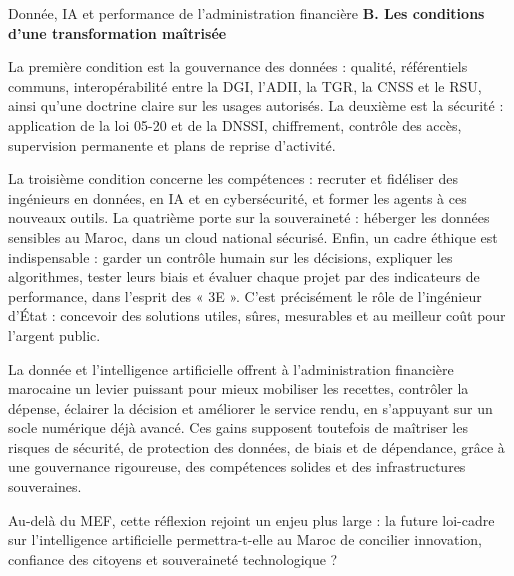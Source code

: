 \begin{copiemodele}{Donnée, IA et performance de l'administration financière}
\textbf{B. Les conditions d'une transformation maîtrisée}

La première condition est la gouvernance des données : qualité, référentiels communs, interopérabilité entre la DGI, l'ADII, la TGR, la CNSS et le RSU, ainsi qu'une doctrine claire sur les usages autorisés. La deuxième est la sécurité : application de la loi 05-20 et de la DNSSI, chiffrement, contrôle des accès, supervision permanente et plans de reprise d'activité.

La troisième condition concerne les compétences : recruter et fidéliser des ingénieurs en données, en IA et en cybersécurité, et former les agents à ces nouveaux outils. La quatrième porte sur la souveraineté : héberger les données sensibles au Maroc, dans un cloud national sécurisé. Enfin, un cadre éthique est indispensable : garder un contrôle humain sur les décisions, expliquer les algorithmes, tester leurs biais et évaluer chaque projet par des indicateurs de performance, dans l'esprit des « 3E ». C'est précisément le rôle de l'ingénieur d'État : concevoir des solutions utiles, sûres, mesurables et au meilleur coût pour l'argent public.

La donnée et l'intelligence artificielle offrent à l'administration financière marocaine un levier puissant pour mieux mobiliser les recettes, contrôler la dépense, éclairer la décision et améliorer le service rendu, en s'appuyant sur un socle numérique déjà avancé. Ces gains supposent toutefois de maîtriser les risques de sécurité, de protection des données, de biais et de dépendance, grâce à une gouvernance rigoureuse, des compétences solides et des infrastructures souveraines.

Au-delà du MEF, cette réflexion rejoint un enjeu plus large : la future loi-cadre sur l'intelligence artificielle permettra-t-elle au Maroc de concilier innovation, confiance des citoyens et souveraineté technologique ?
\end{copiemodele}

